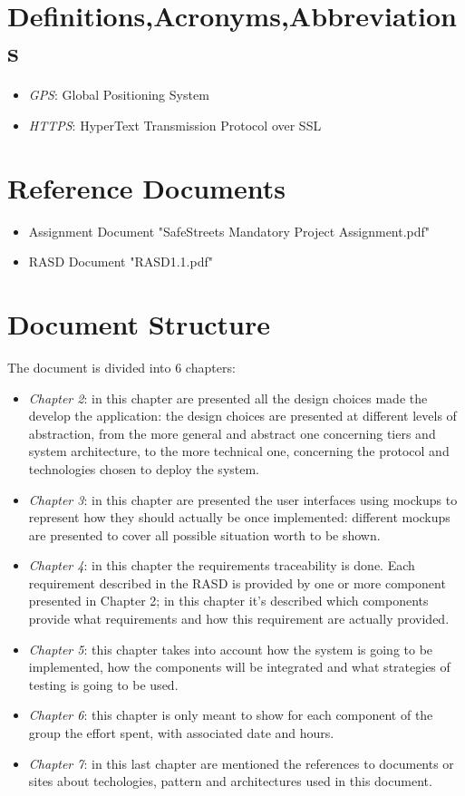 \documentclass[a4paper]{report}
\begin{document}
\section{Definitions,Acronyms,Abbreviations}
\begin{itemize}
\item \textit{GPS}: Global Positioning System
\item \textit{HTTPS}: HyperText Transmission Protocol over SSL
\end{itemize}
\section{Reference Documents}
\begin{itemize}
\item Assignment Document "SafeStreets Mandatory Project Assignment.pdf"
\item RASD Document "RASD1.1.pdf"
\end{itemize}
\section{Document Structure}
The document is divided into 6 chapters:
\begin{itemize}
\item \textit{Chapter 2}: in this chapter are presented all the design choices made the develop the application: the design choices are presented at different levels of abstraction, from the more general and abstract one concerning tiers and system architecture, to the more technical one, concerning the protocol and technologies chosen to deploy the system.
\item \textit{Chapter 3}: in this chapter are presented the user interfaces using mockups to represent how they should actually be once implemented: different mockups are presented to cover all possible situation worth to be shown.
\item \textit{Chapter 4}: in this chapter the requirements traceability is done. Each requirement described in the RASD is provided by one or more component presented in Chapter 2; in this chapter it's described which components provide what requirements and how this requirement are actually provided.
\item \textit{Chapter 5}: this chapter takes into account how the system is going to be implemented, how the components will be integrated and what strategies of testing is going to be used.
\item \textit{Chapter 6}: this chapter is only meant to show for each component of the group the effort spent, with associated date and hours.
\item \textit{Chapter 7}: in this last chapter are mentioned the references to documents or sites about techologies, pattern and architectures used in this document.

\end{itemize}
\end{document}
